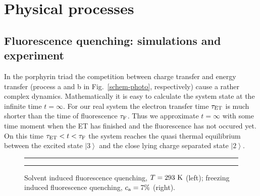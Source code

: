 \documentclass[12pt,twoside,a4paper]{report}
\begin{document}
\section{Physical processes} 
 
\subsection{Fluorescence quenching: simulations and experiment} \label{PhysProc-A} 


In the porphyrin triad the competition between charge transfer and 
energy transfer (process a and b in Fig.~\ref{schem-photo}, 
respectively) cause a rather complex dynamics.
Mathematically it is easy to calculate 
the system state at the infinite time $t=\infty$.
For our real system 
the electron transfer time $\tau_{\rm ET}$ 
is much shorter than 
the time of  fluorescence $\tau_{\rm F}$.
Thus we approximate $t=\infty$ with 
some time moment when 
the ET has finished
and the fluorescence has not occured yet.
On this time 
$\tau
 _{\rm ET}
           <
               t
           <
               \tau_{\rm F}$ 
the system reaches the quasi thermal equilibrium
between the excited state 
$\left| 
         3
 \right\rangle $ and 
the close lying charge separated state 
$\left| 
         2 
 \right\rangle $. 












\begin{footnotesize}\begin{figure}[!h]
\begin{center}
\parbox{5cm}{
\rule{-3cm}{0cm}
\epsfxsize=6.3cm 
}
\parbox{5cm}
{
\rule{0.4cm}{-0.5cm}\epsfxsize=6cm 
}
\end{center}
 \caption[Solvent and freezing induced fluorescence quenching]
{\small 
\label{solvent-quenching} 
Solvent induced fluorescence quenching, $T=293~{\rm K}$ (left); 
freezing induced fluorescence quenching, $c_{\rm a}=7\%$ (right).}
\end{figure}\end{footnotesize} 
\end{document}
